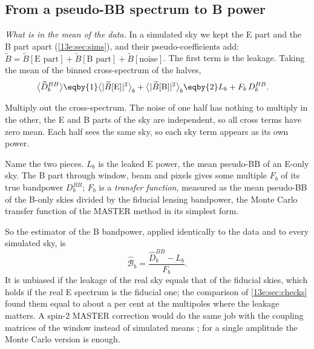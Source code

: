 \subsection{From a pseudo-BB spectrum to B power}
\label{13e:sec:bb-estimator}

\emph{What is in the mean of the data.} In a simulated sky we kept the E part and the B part apart
(\cref{13e:sec:sims}), and their pseudo-coefficients add: $\widetilde B=\widetilde B[\text{E part}]+\widetilde B[\text{B part}]+\widetilde
B[\text{noise}]$. The first term is the leakage. Taking the mean of the binned cross-spectrum of the halves,
\begin{align}
  \bigl\langle\widehat D^{BB}_b\bigr\rangle
  &\eqby{1}\bigl\langle|\widetilde B[\text{E}]|^2\bigr\rangle_b+\bigl\langle|\widetilde B[\text{B}]|^2\bigr\rangle_b
  \eqby{2}L_b+F_b\,D^{BB}_b .
  \label{13e:eq:bb-mean}
\end{align}
\begin{explain}
  \item Multiply out the cross-spectrum. The noise of one half has nothing to multiply in the other, the E and
        B parts of the sky are independent, so all cross terms have zero mean. Each half sees the same sky, so
        each sky term appears as its own power.
  \item Name the two pieces. $L_b$ is the leaked E power, the mean pseudo-BB of an E-only sky. The B part
        through window, beam and pixels gives some multiple $F_b$ of its true bandpower $D^{BB}_b$; $F_b$ is a
        \emph{transfer function}, measured as the mean pseudo-BB of the B-only skies divided by the fiducial
        lensing bandpower, the Monte Carlo transfer function of the MASTER method \cite{Hivon2002} in its simplest form.
\end{explain}
So the estimator of the B bandpower, applied identically to the data and to every simulated sky, is
\begin{equation}
  \widehat{\mathcal B}_b=\frac{\widehat D^{BB}_b-L_b}{F_b} .
  \label{13e:eq:bbhat}
\end{equation}
It is unbiased if the leakage of the real sky equals that of the fiducial skies, which holds if the real E
spectrum is the fiducial one; the comparison of \cref{13e:sec:checks} found them equal to about a per cent at
the multipoles where the leakage matters. A spin-2 MASTER correction would do the same job with the coupling
matrices of the window instead of simulated means \cite{Alonso2019}; for a single amplitude the Monte Carlo
version is enough.

